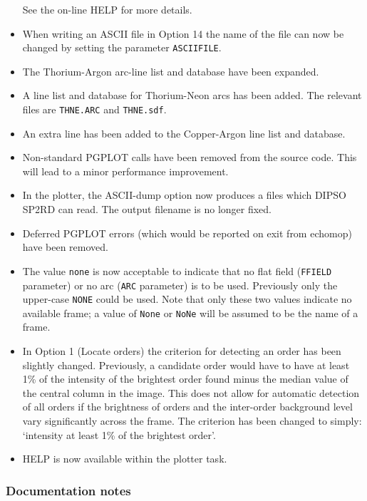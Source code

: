 \documentclass[twoside,11pt]{article}
\newcommand{\htmlref}[2]{#1}
\renewcommand{\_}{\texttt{\symbol{95}}}
\begin{document}
\begin{itemize}
   See the on-line HELP for more details.
\item When writing an ASCII file in Option 14 the name of the file can
   now be changed by setting the parameter
   \htmlref{{\tt{ASCII\_FILE}}}{par_ASCII_FILE}.
\item The Thorium-Argon arc-line list and database have been expanded.
\item A line list and database for Thorium-Neon arcs has been added.
   The relevant files are \texttt{THNE.ARC} and \texttt{THNE.sdf}.
\item An extra line has been added to the Copper-Argon line list and
   database.
\item Non-standard PGPLOT calls have been removed from the source code.
   This will lead to a minor performance improvement.
\item In the plotter, the ASCII-dump option now produces a files which
   DIPSO SP2RD can read.  The output filename is no longer fixed.
\item Deferred PGPLOT errors (which would be reported on exit from
   {\sc echomop}) have been removed.
\item The value \texttt{none} is now acceptable to indicate that no flat
   field (\htmlref{{\tt{FFIELD}}}{par_FFIELD} parameter) or no arc
   (\htmlref{{\tt{ARC}}}{par_ARC} parameter) is to  be used.
   Previously only the upper-case \texttt{NONE} could be used.  Note that
   only these two values indicate no available frame; a value of
   \texttt{None} or \texttt{NoNe} will be assumed to be the name of a frame.
\item In Option 1 (Locate orders) the criterion for detecting an order
   has been slightly changed.  Previously, a candidate order would
   have to have at least 1\% of the intensity of the brightest order
   found minus the median value of the central column in the image.
   This does not allow for automatic detection of all orders if the
   brightness of orders and the inter-order background level vary
   significantly across the frame.  The criterion has been changed
   to simply: `intensity at least 1\% of the brightest order'.
\item HELP is now available within the plotter task.
\end{itemize}

\subsubsection{Documentation notes}
\end{document}
